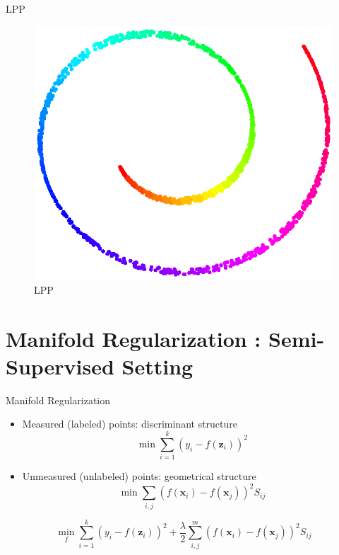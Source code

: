 \documentclass{beamer}
\newcommand{\bol}[1]{\textbf{#1}}
\begin{document}
\begin{darkframes}
   \begin{frame}{LPP}
   \begin{figure}
   \centering
   \includegraphics[scale=0.5]{./figs/le1.eps}
   \caption{LPP}
   \end{figure}
   \end{frame}
   
   \section{Manifold Regularization : Semi-Supervised Setting}
   \begin{frame}{Manifold Regularization}
   \begin{itemize}
   	\item \alert{Measured (labeled)} points: discriminant structure\\
   	\begin{displaymath}
   		\min\sum_{i = 1}^k\left(y_i - f(\bol{z}_i)\right)^2
   	\end{displaymath}
	\item \alert{Unmeasured (unlabeled)} points: geometrical structure\\
	\begin{displaymath}
		\min\sum_{i,j}\left(f(\bol{x}_i) - f(\bol{x}_j)\right)^2S_{ij}
	\end{displaymath}
   \end{itemize}
   \begin{displaymath}
   		\min_f\sum_{i = 1}^k\left(y_i - f(\bol{z}_i)\right)^2 + \frac{\lambda}{2}\sum_{i,j}^m\left(f(\bol{x}_i) - f(\bol{x}_j)\right)^2S_{ij}
   \end{displaymath}
   \end{frame}
   

\end{darkframes}
\end{document}

